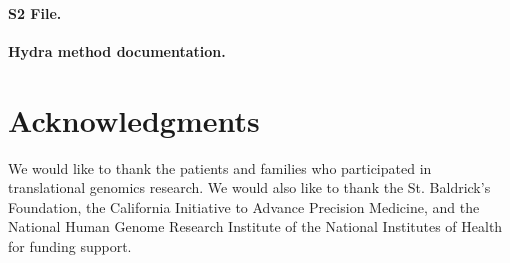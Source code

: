 \documentclass[10pt,letterpaper]{article}
\begin{document}
\paragraph*{S2 File.}
\label{S2_File}
{\bf Hydra method documentation.}



\section*{Acknowledgments}
We would like to thank the patients and families who participated in translational genomics research. We would also like to thank the St. Baldrick's Foundation, the California Initiative to Advance Precision Medicine, and the National Human Genome Research Institute of the National Institutes of Health for funding support.

\nolinenumbers

%
%
%

%
%

\end{document}
